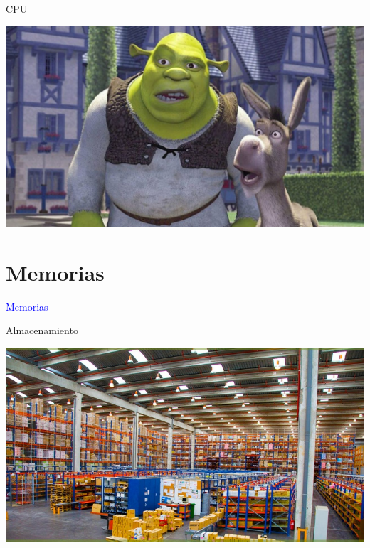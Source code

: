 \documentclass[10pt,xcolor={dvipsnames}]{beamer}
\begin{document}
\begin{frame}{CPU}
\begin{center}
\end{center}
\end{frame}


\begin{frame}
\begin{center}
\includegraphics[scale=0.25]{Figures/Shrek3}
\end{center}
\end{frame}

\section{Memorias}
\begin{frame}
\begin{center}
\Huge{\textcolor{blue}{Memorias}}
\end{center}
\end{frame}

\begin{frame}{Almacenamiento}
\begin{center}
\includegraphics[scale=0.4]{Figures/Bodega}
\end{center}
\end{frame}
\end{document}
